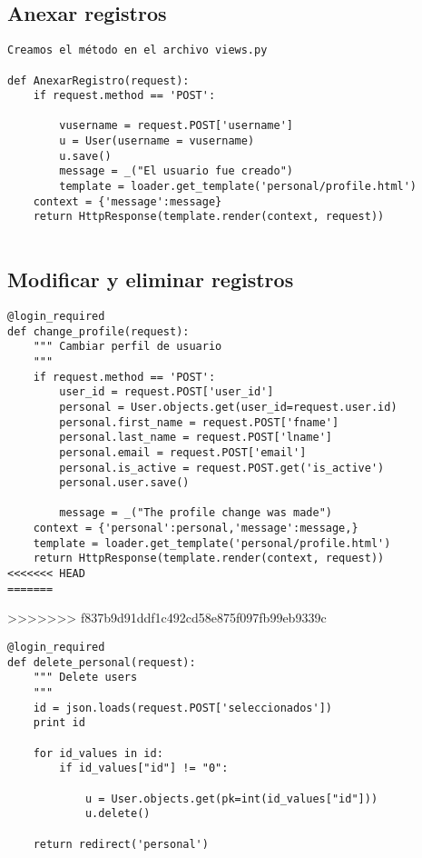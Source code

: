 \documentclass[xcolor=dvipsnames]{beamer}
\begin{document}
\subsection{Anexar registros}
\begin{frame}[fragile]
\begin{verbatim}
Creamos el método en el archivo views.py

def AnexarRegistro(request):
    if request.method == 'POST':
        
        vusername = request.POST['username']
        u = User(username = vusername)
        u.save()
        message = _("El usuario fue creado")
        template = loader.get_template('personal/profile.html')
    context = {'message':message}
    return HttpResponse(template.render(context, request))
       
\end{verbatim}
\end{frame}

\subsection{Modificar y eliminar registros}
\begin{frame}[fragile]
\begin{verbatim}
@login_required
def change_profile(request):
    """ Cambiar perfil de usuario
    """
    if request.method == 'POST':
        user_id = request.POST['user_id']
        personal = User.objects.get(user_id=request.user.id)               
        personal.first_name = request.POST['fname']
        personal.last_name = request.POST['lname']
        personal.email = request.POST['email']
        personal.is_active = request.POST.get('is_active')
        personal.user.save()
        
        message = _("The profile change was made")
	context = {'personal':personal,'message':message,}
    template = loader.get_template('personal/profile.html')
    return HttpResponse(template.render(context, request))
<<<<<<< HEAD
=======

\end{verbatim}
\end{frame}
>>>>>>> f837b9d91ddf1c492cd58e875f097fb99eb9339c

\begin{frame}[fragile]
\begin{verbatim}
@login_required
def delete_personal(request):
    """ Delete users 
    """
    id = json.loads(request.POST['seleccionados'])
    print id 
 
    for id_values in id:
        if id_values["id"] != "0":
	           
            u = User.objects.get(pk=int(id_values["id"]))
            u.delete()   
	   
    return redirect('personal')
\end{verbatim}
\end{frame}
\end{document}
